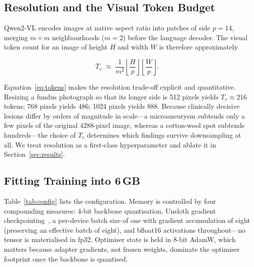 \documentclass[conference]{IEEEtran}
\begin{document}
\subsection{Resolution and the Visual Token Budget}
Qwen2-VL encodes images at native aspect ratio into patches of side $p = 14$,
merging $m \times m$ neighbourhoods ($m = 2$) before the language decoder. The
visual token count for an image of height $H$ and width $W$ is therefore
approximately

\begin{equation}
T_v \;\approx\; \frac{1}{m^{2}}
\left\lfloor \frac{H}{p} \right\rfloor
\left\lfloor \frac{W}{p} \right\rfloor .
\label{eq:tokens}
\end{equation}

Equation~\eqref{eq:tokens} makes the resolution trade-off explicit and
quantitative. Resizing a fundus photograph so that its longer side is 512 pixels
yields $T_v \approx 216$ tokens; 768 pixels yields 486; 1024 pixels yields 888.
Because clinically decisive lesions differ by orders of magnitude in scale---a
microaneurysm subtends only a few pixels of the original $4288$-pixel image,
whereas a cotton-wool spot subtends hundreds---the choice of $T_v$ determines
which findings survive downsampling at all. We treat resolution as a
first-class hyperparameter and ablate it in Section~\ref{sec:results}.

\subsection{Fitting Training into 6\,GB}
Table~\ref{tab:config} lists the configuration. Memory is controlled by four
compounding measures: 4-bit backbone quantisation, Unsloth gradient
checkpointing~\cite{unsloth2024}, a per-device batch size of one with gradient
accumulation of eight (preserving an effective batch of eight), and bfloat16
activations throughout---no tensor is materialised in fp32. Optimiser state is
held in 8-bit AdamW, which matters because adapter gradients, not frozen weights,
dominate the optimiser footprint once the backbone is quantised.
\end{document}
